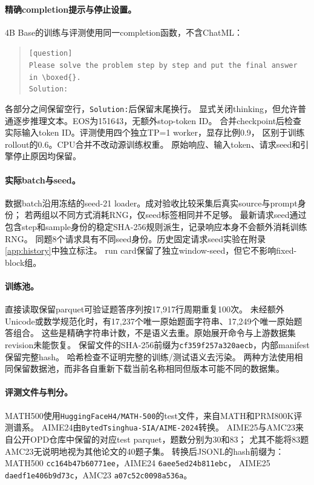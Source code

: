 \paragraph{精确completion提示与停止设置。}
4B Base的训练与评测使用同一completion函数，不含ChatML：
\begin{quote}\small
\texttt{[question]}\\
\texttt{Please solve the problem step by step and put the final answer in}\ \verb|\boxed{}.|\\
\texttt{Solution:}
\end{quote}
各部分之间保留空行，\texttt{Solution:}后保留末尾换行。
显式关闭thinking，但允许普通逐步推理文本。EOS为151643，无额外stop-token ID。
合并checkpoint后检查实际输入token ID。评测使用四个独立TP=1 worker，显存比例0.9，
区别于训练rollout的0.6。CPU合并不改动源训练权重。
原始响应、输入token、请求seed和引擎停止原因均保留。

\paragraph{实际batch与seed。}
数据batch沿用冻结的seed-21 loader。成对验收比较采集后真实source与prompt身份；
若两组以不同方式消耗RNG，仅seed标签相同并不足够。
最新请求seed通过包含step和sample身份的稳定SHA-256规则派生，记录响应本身不会额外消耗训练RNG。
同题8个请求具有不同seed身份。历史固定请求seed实验在附录\ref{app:history}中独立标注。
run card保留了独立window-seed，但它不影响fixed-block组。

\paragraph{训练池。}
直接读取保留parquet可验证题答序列按17,917行周期重复100次。
未经额外Unicode或数学规范化时，有17,237个唯一原始题面字符串、17,249个唯一原始题答组合。
这些是精确字符串计数，不是语义去重。原始展开命令与上游数据集revision未能恢复。
保留文件的SHA-256前缀为\texttt{cf359f257a320aecb}，内部manifest保留完整hash。
哈希检查不证明完整的训练/测试语义去污染。
两种方法使用相同保留数据池，而非各自重新下载当前名称相同但版本可能不同的数据集。

\paragraph{评测文件与判分。}
MATH500使用\texttt{HuggingFaceH4/MATH-500}的test文件，来自MATH和PRM800K评测谱系\citep{math,prm800k}。
AIME24由\texttt{BytedTsinghua-SIA/AIME-2024}转换。
AIME25与AMC23来自公开OPD仓库中保留的对应test parquet，题数分别为30和83；
尤其不能将83题AMC23无说明地视为其他论文的40题子集。
转换后JSONL的hash前缀为：MATH500 \texttt{cc164b47b60771ee}，AIME24 \texttt{6aee5ed24b811ebc}，
AIME25 \texttt{daedf1e406b9d73c}，AMC23 \texttt{a07c52c0098a536a}。

